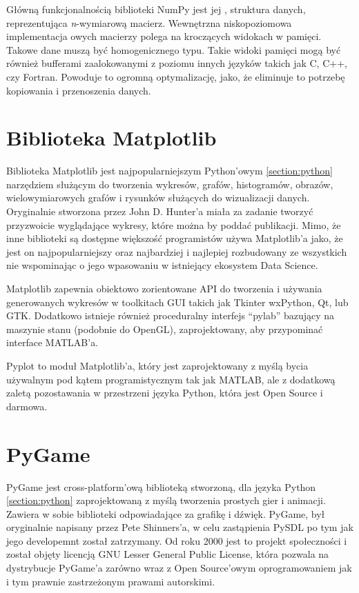 Główną funkcjonalnością biblioteki NumPy jest jej , struktura danych, reprezentująca \textit{n}-wymiarową macierz. Wewnętrzna niskopoziomowa implementacja owych macierzy polega na kroczących widokach w pamięci. Takowe dane muszą być homogenicznego typu. Takie widoki pamięci mogą być również bufferami zaalokowanymi z poziomu innych języków takich jak C, C++, czy Fortran. Powoduje to ogromną optymalizację, jako, że eliminuje to potrzebę kopiowania i przenoszenia danych.



\section{Biblioteka Matplotlib}
\label{section:matplotlib}

Biblioteka Matplotlib \cite{MatplotlibDocumentation} \cite{Matplotlib30Cookbook} \cite{PythonForDataAnalysis} \cite{WikipediaMatplotlib} jest najpopularniejszym Python'owym \ref{section:python} narzędziem służącym do tworzenia wykresów, grafów, histogramów, obrazów, wielowymiarowych grafów i rysunków służących do wizualizacji danych. Oryginalnie stworzona przez John D. Hunter'a miała za zadanie tworzyć przyzwoicie wyglądające wykresy, które można by poddać publikacji. Mimo, że inne biblioteki są dostępne większość programistów używa Matplotlib'a jako, że jest on najpopularniejszy oraz najbardziej i najlepiej rozbudowany ze wszystkich nie wspominając o jego wpasowaniu w istniejący ekosystem Data Science.

Matplotlib zapewnia obiektowo zorientowane API do tworzenia i używania generowanych wykresów w toolkitach GUI takich jak Tkinter wxPython, Qt, lub GTK. Dodatkowo istnieje również proceduralny interfejs ``pylab'' bazujący na maszynie stanu (podobnie do OpenGL), zaprojektowany, aby przypominać interface MATLAB'a.

Pyplot to moduł Matplotlib'a, który jest zaprojektowany z myślą bycia używalnym pod kątem programistycznym tak jak MATLAB, ale z dodatkową zaletą pozostawania w przestrzeni języka Python, która jest Open Source i darmowa.


\section{PyGame}
\label{section:pygame}

PyGame \cite{PyGameDocumentation} \cite{WikipediaPyGame} jest cross-platform'ową biblioteką stworzoną, dla języka Python \ref{section:python} zaprojektowaną z myślą tworzenia prostych gier i animacji. Zawiera w sobie biblioteki odpowiadające za grafikę i dźwięk.
PyGame, był oryginalnie napisany przez Pete Shinners'a, w celu zastąpienia PySDL po tym jak jego developemnt został zatrzymany. Od roku 2000 jest to projekt społeczności i został objęty licencją GNU Lesser General Public License, która pozwala na dystrybucje PyGame'a zarówno wraz z Open Source'owym oprogramowaniem jak i tym prawnie zastrzeżonym prawami autorskimi.




